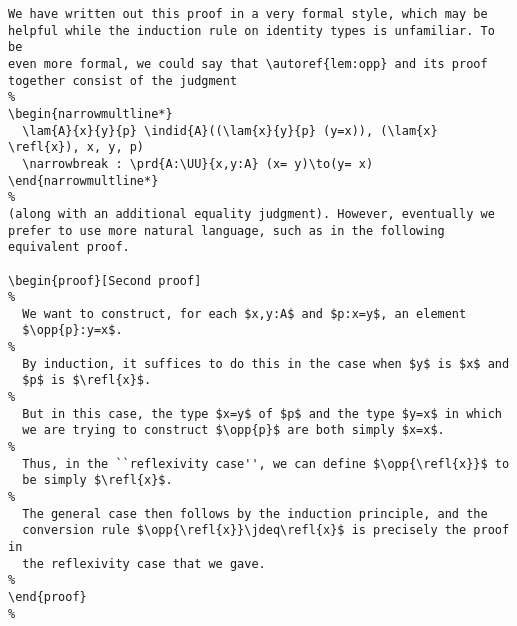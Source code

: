 \documentclass[a4paper]{amsart}
\begin{document}
\begin{verbatim}
We have written out this proof in a very formal style, which may be 
helpful while the induction rule on identity types is unfamiliar. To be 
even more formal, we could say that \autoref{lem:opp} and its proof 
together consist of the judgment
%
\begin{narrowmultline*}
  \lam{A}{x}{y}{p} \indid{A}((\lam{x}{y}{p} (y=x)), (\lam{x} \refl{x}), x, y, p)
  \narrowbreak : \prd{A:\UU}{x,y:A} (x= y)\to(y= x)
\end{narrowmultline*}
%
(along with an additional equality judgment). However, eventually we 
prefer to use more natural language, such as in the following 
equivalent proof.

\begin{proof}[Second proof]
%
  We want to construct, for each $x,y:A$ and $p:x=y$, an element 
  $\opp{p}:y=x$.
%
  By induction, it suffices to do this in the case when $y$ is $x$ and 
  $p$ is $\refl{x}$.
%
  But in this case, the type $x=y$ of $p$ and the type $y=x$ in which 
  we are trying to construct $\opp{p}$ are both simply $x=x$.
%
  Thus, in the ``reflexivity case'', we can define $\opp{\refl{x}}$ to 
  be simply $\refl{x}$.
%
  The general case then follows by the induction principle, and the 
  conversion rule $\opp{\refl{x}}\jdeq\refl{x}$ is precisely the proof in 
  the reflexivity case that we gave.
%
\end{proof}
%
\end{verbatim}

\printbibliography
\end{document}
